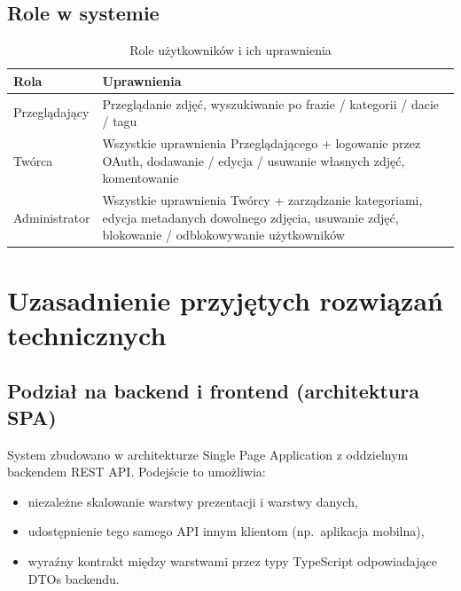\documentclass[12pt, a4paper]{article}
\begin{document}
\subsection{Role w systemie}

\begin{table}[H]
  \centering
  \caption{Role użytkowników i ich uprawnienia}
  \begin{tabular}{@{}L{3cm}L{10cm}@{}}
    \toprule
    \textbf{Rola} & \textbf{Uprawnienia} \\
    \midrule
    Przeglądający & Przeglądanie zdjęć, wyszukiwanie po frazie / kategorii / dacie / tagu \\
    \addlinespace
    Twórca        & Wszystkie uprawnienia Przeglądającego + logowanie przez OAuth,
                    dodawanie / edycja / usuwanie własnych zdjęć, komentowanie \\
    \addlinespace
    Administrator & Wszystkie uprawnienia Twórcy + zarządzanie kategoriami,
                    edycja metadanych dowolnego zdjęcia, usuwanie zdjęć,
                    blokowanie / odblokowywanie użytkowników \\
    \bottomrule
  \end{tabular}
\end{table}

\section{Uzasadnienie przyjętych rozwiązań technicznych}

\subsection{Podział na backend i frontend (architektura SPA)}

System zbudowano w architekturze Single Page Application z oddzielnym backendem REST API.
Podejście to umożliwia:

\begin{itemize}
  \item niezależne skalowanie warstwy prezentacji i warstwy danych,
  \item udostępnienie tego samego API innym klientom (np.\ aplikacja mobilna),
  \item wyraźny kontrakt między warstwami przez typy TypeScript odpowiadające DTOs backendu.
\end{itemize}
\end{document}
